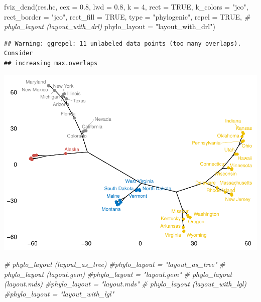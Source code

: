 \documentclass[
]{article}
\newenvironment{Shaded}{\begin{snugshade}}{\end{snugshade}}
\newcommand{\AttributeTok}[1]{\textcolor[rgb]{0.77,0.63,0.00}{#1}}
\newcommand{\CommentTok}[1]{\textcolor[rgb]{0.56,0.35,0.01}{\textit{#1}}}
\newcommand{\ConstantTok}[1]{\textcolor[rgb]{0.00,0.00,0.00}{#1}}
\newcommand{\DecValTok}[1]{\textcolor[rgb]{0.00,0.00,0.81}{#1}}
\newcommand{\FloatTok}[1]{\textcolor[rgb]{0.00,0.00,0.81}{#1}}
\newcommand{\FunctionTok}[1]{\textcolor[rgb]{0.00,0.00,0.00}{#1}}
\newcommand{\NormalTok}[1]{#1}
\newcommand{\StringTok}[1]{\textcolor[rgb]{0.31,0.60,0.02}{#1}}
\begin{document}
\begin{Shaded}
\begin{Highlighting}[]
\FunctionTok{fviz\_dend}\NormalTok{(res.hc, }\AttributeTok{cex =} \FloatTok{0.8}\NormalTok{, }\AttributeTok{lwd =} \FloatTok{0.8}\NormalTok{, }\AttributeTok{k =} \DecValTok{4}\NormalTok{, }
          \AttributeTok{rect =} \ConstantTok{TRUE}\NormalTok{, }\AttributeTok{k\_colors =} \StringTok{"jco"}\NormalTok{, }\AttributeTok{rect\_border =} \StringTok{"jco"}\NormalTok{, }
          \AttributeTok{rect\_fill =} \ConstantTok{TRUE}\NormalTok{, }\AttributeTok{type =} \StringTok{"phylogenic"}\NormalTok{, }\AttributeTok{repel =} \ConstantTok{TRUE}\NormalTok{,}
\CommentTok{\# phylo\_layout (layout\_with\_drl)}
          \AttributeTok{phylo\_layout =} \StringTok{"layout\_with\_drl"}\NormalTok{)}
\end{Highlighting}
\end{Shaded}

\begin{verbatim}
## Warning: ggrepel: 11 unlabeled data points (too many overlaps). Consider
## increasing max.overlaps
\end{verbatim}

\includegraphics{clusterjerarquico1_files/figure-latex/unnamed-chunk-16-1.pdf}

\begin{Shaded}
\begin{Highlighting}[]
\CommentTok{\# phylo\_layout (layout\_as\_tree)}
          \CommentTok{\#phylo\_layout = "layout\_as\_tree"          }
\CommentTok{\# phylo\_layout (layout.gem)}
          \CommentTok{\#phylo\_layout = "layout.gem"}
\CommentTok{\# phylo\_layout (layout.mds)}
          \CommentTok{\#phylo\_layout = "layout.mds"}
\CommentTok{\# phylo\_layout (layout\_with\_lgl)}
          \CommentTok{\#phylo\_layout = "layout\_with\_lgl"}
\end{Highlighting}
\end{Shaded}
\end{document}
